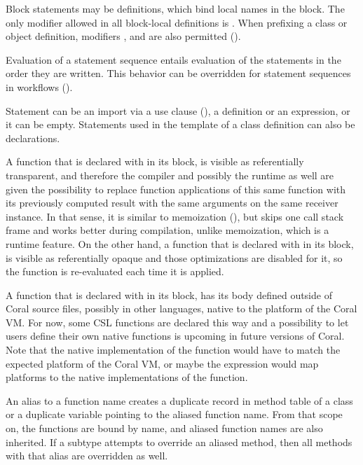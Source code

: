 Block statements may be definitions, which bind local names in the block. The only modifier allowed in all block-local definitions is . When prefixing a class or object definition, modifiers ,  and  are also permitted ().

Evaluation of a statement sequence entails evaluation of the statements in the order they are written. This behavior can be overridden for statement sequences in workflows ().

Statement can be an import via a use clause (), a definition or an expression, or it can be empty. Statements used in the template of a class definition can also be declarations. 

A function that is declared with  in its  block, is visible as referentially transparent, and therefore the compiler and possibly the runtime as well are given the possibility to replace function applications of this same function with its previously computed result with the same arguments on the same receiver instance. In that sense, it is similar to memoization (), but skips one call stack frame and works better during compilation, unlike memoization, which is a runtime feature. On the other hand, a function that is declared with  in its  block, is visible as referentially opaque and those optimizations are disabled for it, so the function is re-evaluated each time it is applied. 

A function that is declared with  in its  block, has its body defined outside of Coral source files, possibly in other languages, native to the platform of the Coral VM. For now, some CSL functions are declared this way and a possibility to let users define their own native functions is upcoming in future versions of Coral. Note that the native implementation of the function would have to match the expected platform of the Coral VM, or maybe the expression would map platforms to the native implementations of the function. 

An alias to a function name creates a duplicate record in method table of a class or a duplicate variable pointing to the aliased function name. From that scope on, the functions are bound by name, and aliased function names are also inherited. If a subtype attempts to override an aliased method, then all methods with that alias are overridden as well. 

